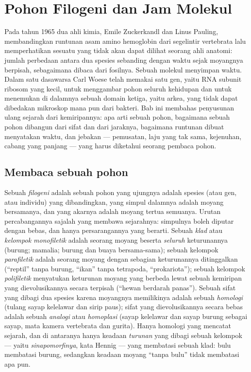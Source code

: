 \chapter{Pohon Filogeni dan Jam Molekul}\label{ch:b2:phylogenetic-trees}

Pada tahun 1965 dua ahli kimia, Emile Zuckerkandl dan Linus Pauling,
membandingkan runtunan asam amino hemoglobin dari segelintir vertebrata
lalu memperhatikan sesuatu yang tidak akan dapat dilihat seorang ahli
anatomi: jumlah perbedaan antara dua spesies sebanding dengan waktu
sejak moyangnya berpisah, sebagaimana dibaca dari fosilnya. Sebuah
molekul menyimpan waktu. Dalam satu dasawarsa Carl Woese telah memakai
satu gen, yaitu RNA subunit ribosom yang kecil, untuk menggambar pohon
seluruh kehidupan dan untuk menemukan di dalamnya sebuah domain ketiga,
yaitu arkea, yang tidak dapat dibedakan mikroskop mana pun dari
bakteri. Bab ini membahas penyusunan ulang sejarah dari kemiripannya:
apa arti sebuah pohon, bagaimana sebuah pohon dibangun dari sifat dan
dari jaraknya, bagaimana runtunan dibuat menyatakan waktu, dan jebakan
--- pemusatan, laju yang tak sama, kejenuhan, cabang yang panjang ---
yang harus diketahui seorang pembaca pohon.

\section{Membaca sebuah pohon}

\begin{definition}\label{def:b2:phylogenetic-trees:tree}
%
Sebuah \emph{filogeni} adalah sebuah pohon yang ujungnya adalah spesies
(atau gen, atau individu) yang dibandingkan, yang simpul dalamnya
adalah moyang bersamanya, dan yang akarnya adalah moyang tertua
semuanya. Urutan percabangannya sajalah yang membawa sejarahnya:
simpulnya boleh diputar dengan bebas, dan hanya persarangannya yang
berarti. Sebuah \emph{klad} atau \emph{kelompok monofiletik} adalah
seorang moyang beserta \emph{seluruh} keturunannya (burung; mamalia;
burung dan buaya bersama-sama); sebuah kelompok \emph{parafiletik}
adalah seorang moyang dengan sebagian keturunannya ditinggalkan
(``reptil'' tanpa burung, ``ikan'' tanpa tetrapoda, ``prokariota'');
sebuah kelompok \emph{polifiletik} menyatukan keturunan moyang yang
berbeda lewat sebuah kemiripan yang dievolusikannya secara terpisah
(``hewan berdarah panas''). Sebuah sifat yang dibagi dua spesies karena
moyangnya memilikinya adalah sebuah \emph{homologi} (tulang sayap
kelelawar dan sirip paus); sifat yang dievolusikannya secara bebas
adalah sebuah \emph{analogi} atau \emph{homoplasi} (sayap kelelawar dan
sayap burung sebagai sayap, mata kamera vertebrata dan gurita). Hanya
homologi yang mencatat sejarah, dan di antaranya hanya keadaan
\emph{turunan} yang dibagi sebuah kelompok --- yaitu
\emph{sinapomorfinya}, kata Hennig --- yang membatasi sebuah klad: bulu
membatasi burung, sedangkan keadaan moyang ``tanpa bulu'' tidak
membatasi apa pun.
\end{definition}

